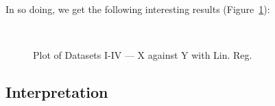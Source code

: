 \documentclass[11pt,a4paper]{article}
\begin{document}
In so doing, we get the following interesting results (Figure~\ref{fig:plots}):

\begin{figure}[ht]
\centering
{}\qquad
{}\\
\qquad%
%
\caption{Plot of Datasets I-IV — X against Y with Lin. Reg.}
\label{fig:plots}
\end{figure}

\subsection{Interpretation}
\end{document}
